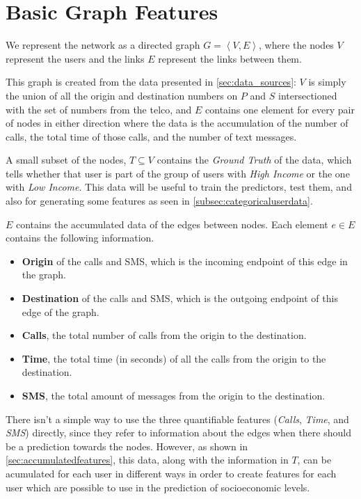 \section{Basic Graph Features}
\label{sec:graphfeatures}

We represent the network as a directed graph $G = \left< V, E \right>$, where the nodes $V$ represent the users and the links $E$ represent the links between them.

This graph is created from the data presented in \cref{sec:data_sources}: $V$ is simply the union of all the origin and destination numbers on $P$ and $S$ intersectioned with the set of numbers from the telco, and $E$ contains one element for every pair of nodes in either direction where the data is the accumulation of the number of calls, the total time of those calls, and the number of text messages.

A small subset of the nodes, $T \subseteq V$ contains the \emph{Ground Truth} of the data, which tells whether that user is part of the group of users with \emph{High Income} or the one with \emph{Low Income}. This data will be useful to train the predictors, test them, and also for generating some features as seen in \cref{subsec:categoricaluserdata}.

$E$ contains the accumulated data of the edges between nodes. Each element $e \in E$ contains the following information.

\begin{itemize}
	\item \textbf{Origin} of the calls and SMS, which is the incoming endpoint of this edge in the graph.
	\item \textbf{Destination} of the calls and SMS, which is the outgoing endpoint of this edge of the graph.
	\item \textbf{Calls}, the total number of calls from the origin to the destination.
	\item \textbf{Time}, the total time (in seconds) of all the calls from the origin to the destination.
	\item \textbf{SMS}, the total amount of messages from the origin to the destination.
\end{itemize}

There isn't a simple way to use the three quantifiable features (\emph{Calls}, \emph{Time}, and \emph{SMS}) directly, since they refer to information about the edges when there should be a prediction towards the nodes. However, as shown in \cref{sec:accumulatedfeatures}, this data, along with the information in $T$, can be acumulated for each user in different ways in order to create features for each user which are possible to use in the prediction of socioeconomic levels.
